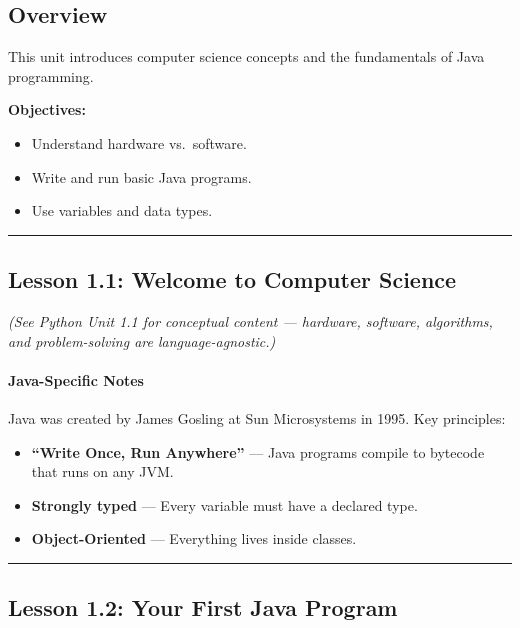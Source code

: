\documentclass[
  justified,
  openright,
]{tufte-book}
\let\subsubsection\paragraph
\let\paragraph\paragraph
\let\subsubsection\paragraph
\let\paragraph\paragraph
\providecommand{\tightlist}{%
  \setlength{\itemsep}{0pt}\setlength{\parskip}{0pt}}
\begin{document}
\subsection{Overview}\label{overview-1}

This unit introduces computer science concepts and the fundamentals of
Java programming.

\textbf{Objectives:}

\begin{itemize}
\tightlist
\item
  Understand hardware vs.~software.
\item
  Write and run basic Java programs.
\item
  Use variables and data types.
\end{itemize}

\begin{center}\rule{0.5\linewidth}{0.5pt}\end{center}

\subsection{Lesson 1.1: Welcome to Computer
Science}\label{lesson-1.1-welcome-to-computer-science}

\emph{(See Python Unit 1.1 for conceptual content --- hardware,
software, algorithms, and problem-solving are language-agnostic.)}

\subsubsection{Java-Specific Notes}\label{java-specific-notes}

Java was created by James Gosling at Sun Microsystems in 1995. Key
principles:

\begin{itemize}
\tightlist
\item
  \textbf{``Write Once, Run Anywhere''} --- Java programs compile to
  bytecode that runs on any JVM.
\item
  \textbf{Strongly typed} --- Every variable must have a declared type.
\item
  \textbf{Object-Oriented} --- Everything lives inside classes.
\end{itemize}

\begin{center}\rule{0.5\linewidth}{0.5pt}\end{center}

\subsection{Lesson 1.2: Your First Java
Program}\label{lesson-1.2-your-first-java-program-1}
\end{document}
